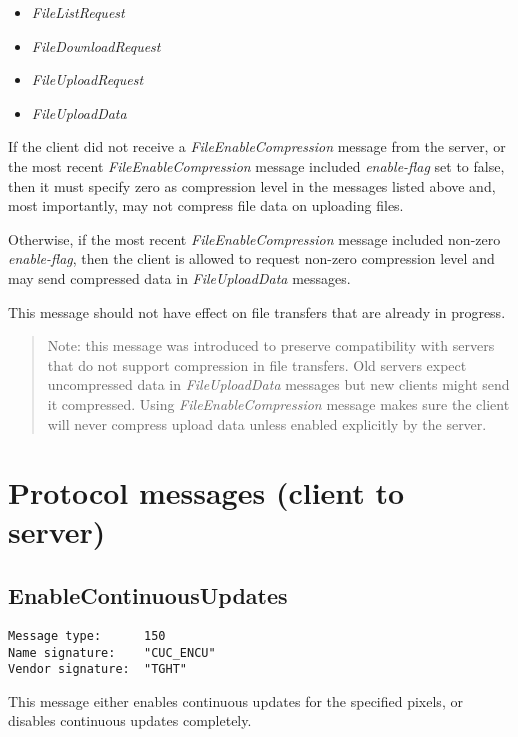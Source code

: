 \documentclass[a4paper]{article}
\newcommand{\typestr}[1]{\textit{#1}}
\begin{document}
\begin{itemize}
\item \typestr{FileListRequest}
\item \typestr{FileDownloadRequest}
\item \typestr{FileUploadRequest}
\item \typestr{FileUploadData}
\end{itemize}

If the client did not receive a \typestr{FileEnableCompression}
message from the server, or the most recent
\typestr{FileEnableCompression} message included \typestr{enable-flag}
set to false, then it must specify zero as compression level in the
messages listed above and, most importantly, may not compress file
data on uploading files.

Otherwise, if the most recent \typestr{FileEnableCompression} message
included non-zero \typestr{enable-flag}, then the client is allowed to
request non-zero compression level and may send compressed data in
\typestr{FileUploadData} messages.

This message should not have effect on file transfers that are already
in progress.

\begin{quote}
Note: this message was introduced to preserve compatibility with
servers that do not support compression in file transfers. Old servers
expect uncompressed data in \typestr{FileUploadData} messages but new
clients might send it compressed. Using
\typestr{FileEnableCompression} message makes sure the client will
never compress upload data unless enabled explicitly by the server.
\end{quote}

\newpage
\section{Protocol messages (client to server)}

\subsection{EnableContinuousUpdates}
\begin{verbatim}
Message type:      150
Name signature:    "CUC_ENCU"
Vendor signature:  "TGHT"
\end{verbatim}

This message either enables continuous updates for the specified
pixels, or disables continuous updates completely.
\end{document}
